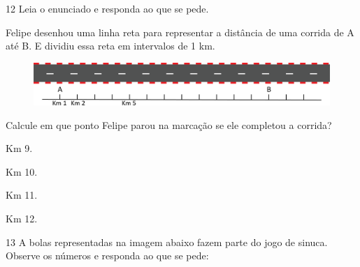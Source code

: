 

\num{12} Leia o enunciado e responda ao que se pede. 

Felipe desenhou uma linha reta para representar a distância de uma corrida de A até B. E dividiu essa reta em intervalos de 1 km.
 

\begin{figure}[htpb!]
\centering
\includegraphics[width=\textwidth]{./media/image6.png}
\end{figure}


\item Calcule em que ponto Felipe parou na marcação se ele completou a corrida?

\begin{minipage}{.5\textwidth}
\begin{escolha}
\item Km 9.

\item Km 10.

\item Km 11.

\item Km 12.
\end{escolha}
\end{minipage}





\num{13} A bolas representadas na imagem abaixo fazem parte do jogo de sinuca. Observe os números e responda ao que se pede:

